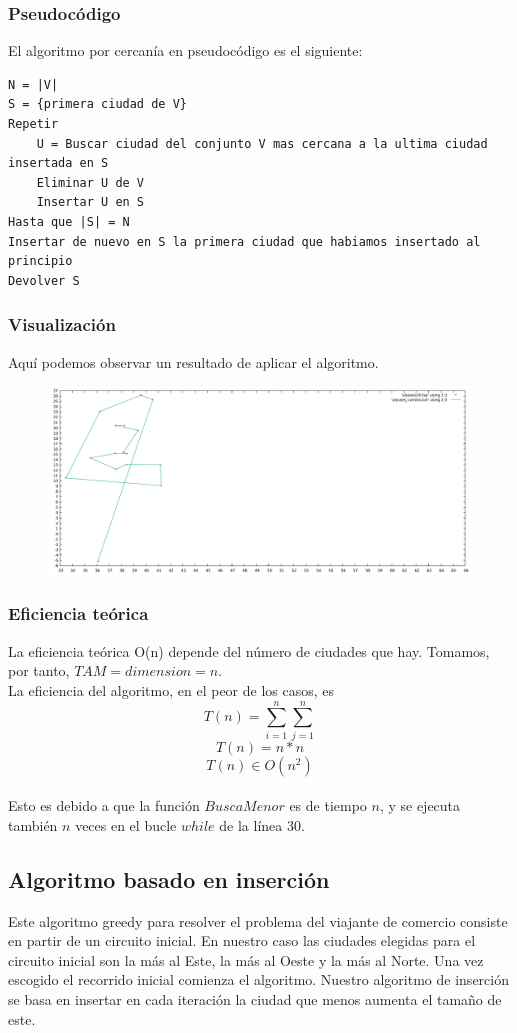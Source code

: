 \documentclass[11pt,a4paper]{article} %
\begin{document}
\subsubsection{Pseudocódigo}
El algoritmo por cercanía en pseudocódigo es el siguiente:
\begin{lstlisting}
N = |V|
S = {primera ciudad de V}
Repetir
	U = Buscar ciudad del conjunto V mas cercana a la ultima ciudad insertada en S
	Eliminar U de V
	Insertar U en S
Hasta que |S| = N
Insertar de nuevo en S la primera ciudad que habiamos insertado al principio
Devolver S
\end{lstlisting}

\subsubsection{Visualización}
Aquí podemos observar un resultado de aplicar el algoritmo.
\begin{figure}[H]
	\centering
	\includegraphics[width=13cm]{data/graphics/cercania/cercania.pdf}
\end{figure}

\subsubsection{Eficiencia teórica}
La eficiencia teórica O(n) depende del número de ciudades que hay. Tomamos, por tanto, $TAM = dimension = n$.\\

La eficiencia del algoritmo, en el peor de los casos, es 
$$T(n) = \sum_{i=1}^{n}\sum_{j=1}^{n}$$
$$T(n) = n*n$$
$$T(n) \in O(n^2)$$\\

Esto es debido a que la función $BuscaMenor$ es de tiempo $n$, y se ejecuta también $n$ veces en el bucle $while$ de la línea 30.



\newpage
\subsection{Algoritmo basado en inserción}
Este algoritmo greedy para resolver el problema del viajante de comercio consiste en partir de un circuito inicial. En nuestro caso las ciudades elegidas para el circuito inicial son la más al Este, la más al Oeste y la más al Norte. Una vez escogido el recorrido inicial comienza el algoritmo. Nuestro algoritmo de inserción se basa en insertar en cada iteración la ciudad que menos aumenta el tamaño de este.
\end{document}
